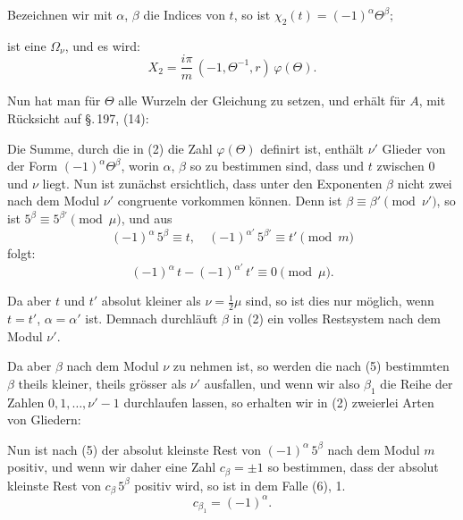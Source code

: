 
Bezeichnen wir mit $\alpha$, $\beta$ die Indices von $t$, so ist $\chi_2(t) = (-1)^\alpha\Theta^\beta;$


ist eine  $\Omega_\nu$, und es wird:
\[
X_2 = \frac{i\pi}{m}\,(-1,\Theta^{-1},r)\,\varphi(\Theta).
\]

Nun hat man für $\Theta$ alle Wurzeln der Gleichung
zu setzen, und erhält für $A$, mit Rücksicht auf \S.\,197, (14):

Die Summe, durch die in (2) die Zahl $\varphi(\Theta)$ definirt ist,
enthält $\nu'$ Glieder von der Form $(-1)^\alpha\Theta^\beta$, worin $\alpha$, $\beta$ so zu
bestimmen sind, dass
und $t$ zwischen 0 und $\nu$ liegt. Nun ist zunächst ersichtlich, dass
unter den Exponenten $\beta$ nicht zwei nach dem Modul $\nu'$ congruente vorkommen können. Denn ist $\beta \equiv \beta' \pmod{\nu'}$, so ist
$5^\beta \equiv 5^{\beta'} \pmod{\mu}$, und aus
\[
(-1)^\alpha\,5^\beta \equiv t, \quad (-1)^{\alpha'}\,5^{\beta'} \equiv t' \pmod{m}
\]
folgt:
\[
(-1)^\alpha\,t - (-1)^{\alpha'}\,t' \equiv 0 \pmod{\mu}.
\]

Da aber $t$ und $t'$ absolut kleiner als $\nu = \tfrac{1}{2}\mu$ sind, so ist
dies nur möglich, wenn $t = t'$, $\alpha = \alpha'$ ist. Demnach durchläuft
$\beta$ in (2) ein volles Restsystem nach dem Modul $\nu'$.

Da aber $\beta$ nach dem Modul $\nu$ zu nehmen ist, so werden die
nach (5) bestimmten $\beta$ theils kleiner, theils grösser als $\nu'$ ausfallen, und wenn wir also $\beta_1$ die Reihe der Zahlen $0, 1, \dots, \nu' - 1$
durchlaufen lassen, so erhalten wir in (2) zweierlei Arten von
Gliedern:

Nun ist nach (5) der absolut kleinste Rest von $(-1)^\alpha\,5^\beta$
nach dem Modul $m$ positiv, und wenn wir daher eine Zahl
$c_\beta = \pm 1$ so bestimmen, dass der absolut kleinste Rest von $c_\beta\,5^\beta$
positiv wird, so ist in dem Falle (6), 1.
\[
c_{\beta_1} = (-1)^\alpha.
\]
